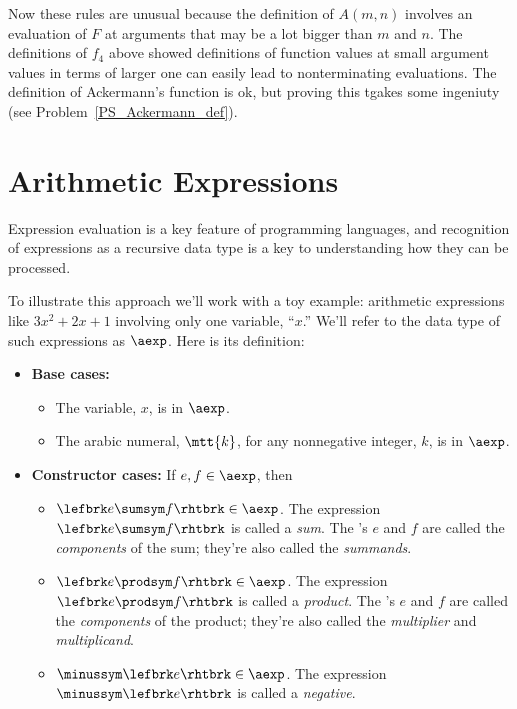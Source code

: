Now these rules are unusual because the definition of $A(m,n)$ involves an
evaluation of $F$ at arguments that may be a lot bigger than $m$ and $n$.
The definitions of $f_4$ above showed definitions of function values at
small argument values in terms of larger one can
easily lead to nonterminating evaluations.   The definition of Ackermann's
function is ok, but proving this tgakes some ingeniuty (see Problem~\ref{PS_Ackermann_def}).


\section{Arithmetic Expressions}
Expression evaluation is a key feature of programming languages, and
recognition of expressions as a recursive data type is a key to
understanding how they can be processed.

To illustrate this approach we'll work with a toy example: arithmetic
expressions like $3x^2 + 2x + 1$ involving only one variable, ``$x$.''
We'll refer to the data type of such expressions as $\aexp$.  Here is its
definition:

\begin{definition}

\begin{itemize}
\item \textbf{Base cases:} \mbox{}

\begin{itemize}

\item The variable, $x$, is in $\aexp$.

\item The arabic numeral, $\mtt{k}$, for any nonnegative integer, $k$, is
  in $\aexp$.

\end{itemize}

\item \textbf{Constructor cases:} If $e,f \in \aexp$, then
\begin{itemize}
\setcounter{enumi}{2}

\item $\lefbrk e \sumsym f \rhtbrk \in \aexp$.  The expression $\lefbrk e \sumsym
  f \rhtbrk$ is called a \emph{sum}.  The \aexp's $e$ and $f$ are called the
  \emph{components} of the sum; they're also called the \emph{summands}.

\item $\lefbrk e \prodsym f\rhtbrk \in \aexp$.  The expression $\lefbrk e \prodsym f\rhtbrk$ is called a
  \emph{product}.  The \aexp's $e$ and $f$ are called the
  \emph{components} of the product; they're also called the
  \emph{multiplier} and \emph{multiplicand}.

\item $\minussym\lefbrk e\rhtbrk \in \aexp$.  The expression $\minussym\lefbrk e\rhtbrk$ is called a
  \emph{negative}.
\end{itemize}
\end{itemize}
\end{definition}

